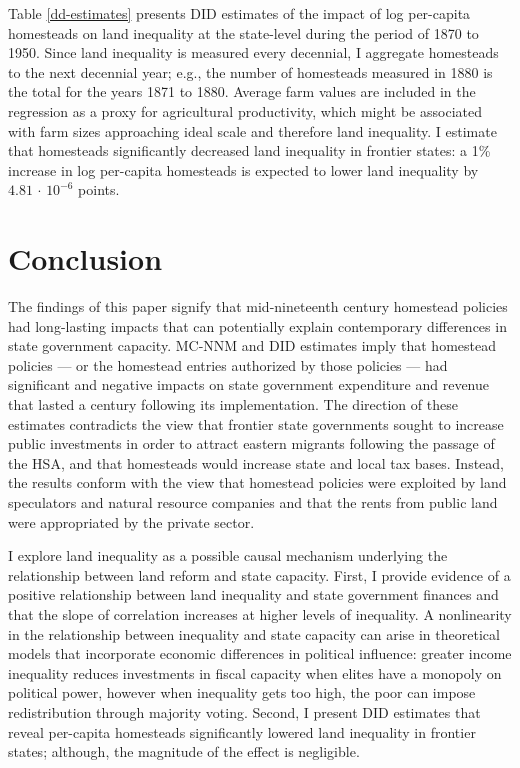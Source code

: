 \documentclass[hidelinks,12pt]{article}
\begin{document}
Table \ref{dd-estimates} presents DID estimates of the impact of log per-capita homesteads on land inequality at the state-level during the period of 1870 to 1950. Since land inequality is measured every decennial, I aggregate homesteads to the next decennial year; e.g., the number of homesteads measured in 1880 is the total for the years 1871 to 1880. Average farm values are included in the regression as a proxy for agricultural productivity, which might be associated with farm sizes approaching ideal scale and therefore land inequality. I estimate that homesteads significantly decreased land inequality in frontier states: a 1\% increase in log per-capita homesteads is expected to lower  land inequality by $4.81\,\cdot\,10^{-6}$ points. 

\section{Conclusion} \label{discussion} 

The findings of this paper signify that mid-nineteenth century homestead policies had long-lasting impacts that can potentially explain contemporary differences in state government capacity. MC-NNM and DID estimates imply that homestead policies --- or the homestead entries authorized by those policies --- had significant and negative impacts on state government expenditure and revenue that lasted a century following its implementation. The direction of these estimates contradicts the view that frontier state governments sought to increase public investments in order to attract eastern migrants following the passage of the HSA, and that homesteads would increase state and local tax bases. Instead, the results conform with the view that homestead policies were exploited by land speculators and natural resource companies and that the rents from public land were appropriated by the private sector. 

I explore land inequality as a possible causal mechanism underlying the relationship between land reform and state capacity. First, I provide evidence of a positive relationship between land inequality and state government finances and that the slope of correlation increases at higher levels of inequality. A nonlinearity in the relationship between inequality and state capacity can arise in theoretical models that incorporate economic differences in political influence: greater income inequality reduces investments in fiscal capacity when elites have a monopoly on political power, however when inequality gets too high, the poor can impose redistribution through majority voting. Second, I present DID estimates that reveal per-capita homesteads significantly lowered land inequality in frontier states; although, the magnitude of the effect is negligible. 
\end{document}
